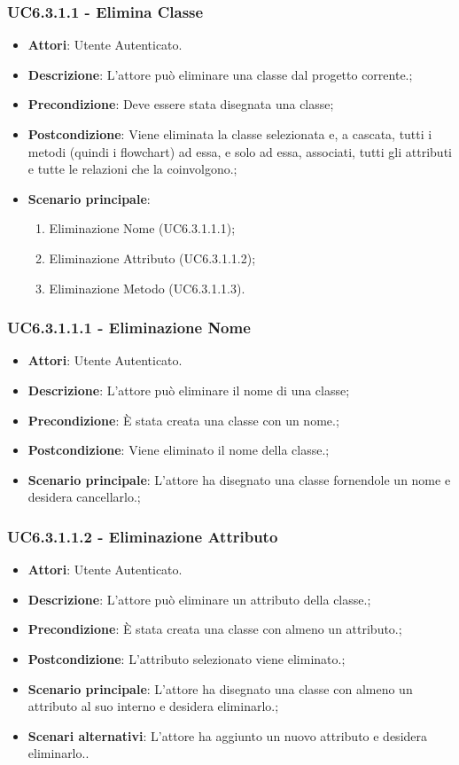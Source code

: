 \subsubsection{UC6.3.1.1 - Elimina Classe} 
\label{sssec:UC6.3.1.1} 
\begin{itemize} 
\item \textbf{Attori}: Utente Autenticato.
\item \textbf{Descrizione}: L'attore può eliminare una classe dal progetto corrente.;
\item \textbf{Precondizione}: Deve essere stata disegnata una classe;
\item \textbf{Postcondizione}: Viene eliminata la classe selezionata e, a cascata, tutti i metodi (quindi i flowchart) ad essa, e solo ad essa, associati, tutti gli attributi e tutte le relazioni che la coinvolgono.;
\item \textbf{Scenario principale}: \begin{enumerate}\item Eliminazione Nome (UC6.3.1.1.1);\item Eliminazione Attributo (UC6.3.1.1.2);\item Eliminazione Metodo (UC6.3.1.1.3). 
 \end{enumerate}
\end{itemize} 
\subsubsection{UC6.3.1.1.1 - Eliminazione Nome} 
\label{sssec:UC6.3.1.1.1} 
\begin{itemize} 
\item \textbf{Attori}: Utente Autenticato.
\item \textbf{Descrizione}: L'attore può eliminare il nome di una classe;
\item \textbf{Precondizione}: È stata creata una classe con un nome.;
\item \textbf{Postcondizione}: Viene eliminato il nome della classe.;
\item \textbf{Scenario principale}: L'attore ha disegnato una classe fornendole un nome e desidera cancellarlo.;\end{itemize} 
\subsubsection{UC6.3.1.1.2 - Eliminazione Attributo} 
\label{sssec:UC6.3.1.1.2} 
\begin{itemize} 
\item \textbf{Attori}: Utente Autenticato.
\item \textbf{Descrizione}: L'attore può eliminare un attributo della classe.;
\item \textbf{Precondizione}: È stata creata una classe con almeno un attributo.;
\item \textbf{Postcondizione}: L'attributo selezionato viene eliminato.;
\item \textbf{Scenario principale}: L'attore ha disegnato una classe con almeno un attributo al suo interno e desidera eliminarlo.;\item \textbf{Scenari alternativi}: L'attore ha aggiunto un nuovo attributo e desidera eliminarlo..
\end{itemize} 
